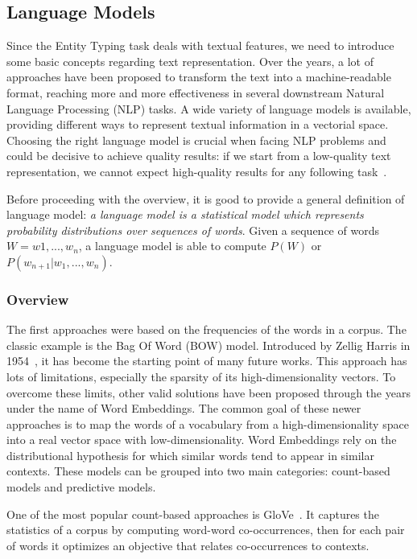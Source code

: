 \subsection{Language Models} \label{language_models}
Since the Entity Typing task deals with textual features, we need to introduce some basic concepts regarding text representation. Over the years, a lot of approaches have been proposed to transform the text into a machine-readable format, reaching more and more effectiveness in several downstream Natural Language Processing (NLP) tasks. A wide variety of language models is available, providing different ways to represent textual information in a vectorial space. Choosing the right language model is crucial when facing NLP problems and could be decisive to achieve quality results: if we start from a low-quality text representation, we cannot expect high-quality results for any following task~\cite{babic2020survey}. 

Before proceeding with the overview, it is good to provide a general definition of language model: \textit{a language model is a statistical model which represents probability distributions over sequences of words}. Given a sequence of words \\$W=w{1},...,w_{n}$, a language model is able to compute $P(W)$ or \\$P(w_{n+1} | w_{1},...,w_{n})$. 

\subsubsection{Overview}
The first approaches were based on the frequencies of the words in a corpus. The classic example is the Bag Of Word (BOW) model. Introduced by Zellig Harris in 1954~\cite{harris1954distributional}, it has become the starting point of many future works. This approach has lots of limitations, especially the sparsity of its high-dimensionality vectors. To overcome these limits, other valid solutions have been proposed through the years under the name of Word Embeddings. The common goal of these newer approaches is to map the words of a vocabulary from a high-dimensionality space into a real vector space with low-dimensionality. Word Embeddings rely on the distributional hypothesis for which similar words tend to appear in similar contexts. These models can be grouped into two main categories: count-based models and predictive models.

One of the most popular count-based approaches is GloVe~\cite{pennington2014glove}. It captures the statistics of a corpus by computing word-word co-occurrences, then for each pair of words it optimizes an objective that relates co-occurrences to contexts. 

